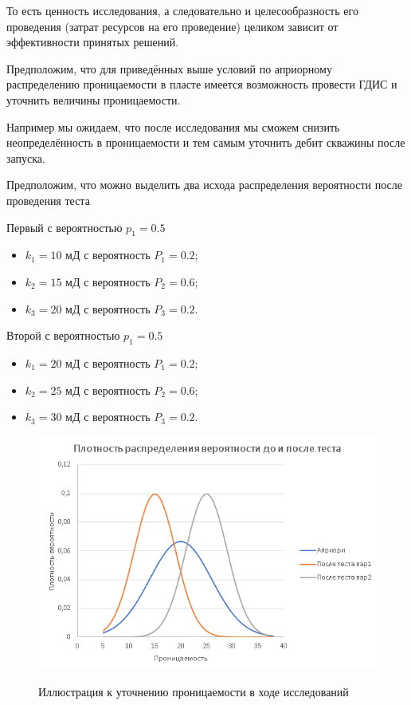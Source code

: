 То есть ценность исследования, а следовательно и целесообразность его проведения (затрат ресурсов на его проведение) целиком зависит от эффективности принятых решений. 

Предположим, что для приведённых выше условий по априорному распределению проницаемости в пласте имеется возможность провести ГДИС и уточнить величины проницаемости. 

Например мы ожидаем, что после исследования мы сможем снизить неопределённость в проницаемости и тем самым уточнить дебит скважины после запуска.  

Предположим, что можно выделить два исхода распределения вероятности после проведения теста

Первый с вероятностью $p_1 = 0.5$

\begin{itemize}
	\item $k_1 = 10$ мД с вероятность $P_1 = 0.2$; 
	\item $k_2 = 15$ мД с вероятность $P_2 = 0.6$; 
	\item $k_3 = 20$ мД с вероятность $P_3 = 0.2$. 
\end{itemize}

Второй с вероятностью $p_1 = 0.5$

\begin{itemize}
	\item $k_1 = 20$ мД с вероятность $P_1 = 0.2$; 
	\item $k_2 = 25$ мД с вероятность $P_2 = 0.6$; 
	\item $k_3 = 30$ мД с вероятность $P_3 = 0.2$. 
\end{itemize}

\begin{figure}[h!]
	\includegraphics[width= 15cm]{pics_2/norm_distribution_ex1.png} 
	\label{fig:sample2}
	\caption{Иллюстрация к уточнению проницаемости в ходе исследований}
\end{figure}

